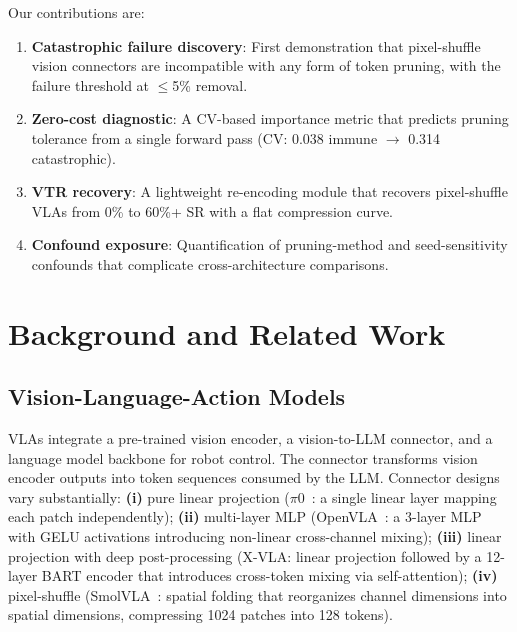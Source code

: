 \documentclass[letterpaper]{article}
\begin{document}
Our contributions are:
\begin{enumerate}
    \item \textbf{Catastrophic failure discovery}: First demonstration that pixel-shuffle vision connectors are incompatible with any form of token pruning, with the failure threshold at $\leq$5\% removal.
    \item \textbf{Zero-cost diagnostic}: A CV-based importance metric that predicts pruning tolerance from a single forward pass (CV: 0.038 immune $\rightarrow$ 0.314 catastrophic).
    \item \textbf{VTR recovery}: A lightweight re-encoding module that recovers pixel-shuffle VLAs from 0\% to 60\%+ SR with a flat compression curve.
    \item \textbf{Confound exposure}: Quantification of pruning-method and seed-sensitivity confounds that complicate cross-architecture comparisons.
\end{enumerate}

\section{Background and Related Work}
\label{sec:background}

\subsection{Vision-Language-Action Models}

VLAs integrate a pre-trained vision encoder, a vision-to-LLM connector, and a language model backbone for robot control.
The connector transforms vision encoder outputs into token sequences consumed by the LLM.
Connector designs vary substantially:
\textbf{(i)} pure linear projection ($\pi$0~\cite{black2024pi0}: a single linear layer mapping each patch independently);
\textbf{(ii)} multi-layer MLP (OpenVLA~\cite{kim2024openvla}: a 3-layer MLP with GELU activations introducing non-linear cross-channel mixing);
\textbf{(iii)} linear projection with deep post-processing (X-VLA: linear projection followed by a 12-layer BART encoder that introduces cross-token mixing via self-attention);
\textbf{(iv)} pixel-shuffle (SmolVLA~\cite{allal2025smolvla}: spatial folding that reorganizes channel dimensions into spatial dimensions, compressing 1024 patches into 128 tokens).
\end{document}
